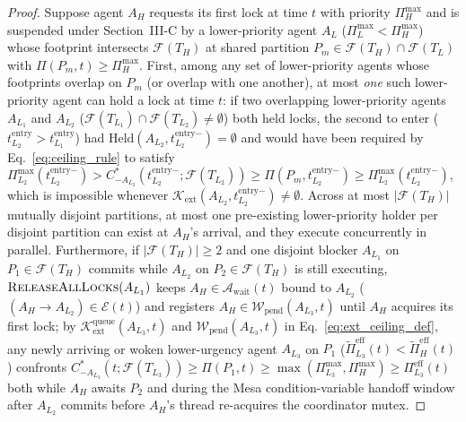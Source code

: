 \documentclass[conference,10pt]{IEEEtran}
\begin{document}
\begin{proof}
Suppose agent $A_H$ requests its first lock at time $t$ with priority $\Pi_H^{\max}$ and is suspended under Section~III-C by a lower-priority agent $A_L$ ($\Pi_L^{\max} < \Pi_H^{\max}$) whose footprint intersects $\mathcal{F}(T_H)$ at shared partition $P_m \in \mathcal{F}(T_H) \cap \mathcal{F}(T_L)$ with $\Pi(P_m, t) \ge \Pi_H^{\max}$. First, among any set of lower-priority agents whose footprints overlap on $P_m$ (or overlap with one another), at most \textit{one} such lower-priority agent can hold a lock at time $t$: if two overlapping lower-priority agents $A_{L_1}$ and $A_{L_2}$ ($\mathcal{F}(T_{L_1}) \cap \mathcal{F}(T_{L_2}) \ne \emptyset$) both held locks, the second to enter ($t_{L_2}^{\text{entry}} > t_{L_1}^{\text{entry}}$) had $\text{Held}(A_{L_2}, t_{L_2}^{\text{entry}-}) = \emptyset$ and would have been required by Eq.~\eqref{eq:ceiling_rule} to satisfy $\Pi_{L_2}^{\max}(t_{L_2}^{\text{entry}-}) > C_{-A_{L_2}}^*(t_{L_2}^{\text{entry}-}; \mathcal{F}(T_{L_2})) \ge \Pi(P_m, t_{L_2}^{\text{entry}-}) \ge \Pi_{L_2}^{\max}(t_{L_2}^{\text{entry}-})$, which is impossible whenever $\mathcal{K}_{\text{ext}}(A_{L_2}, t_{L_2}^{\text{entry}-}) \ne \emptyset$. Across at most $|\mathcal{F}(T_H)|$ mutually disjoint partitions, at most one pre-existing lower-priority holder per disjoint partition can exist at $A_H$'s arrival, and they execute concurrently in parallel. Furthermore, if $|\mathcal{F}(T_H)| \ge 2$ and one disjoint blocker $A_{L_1}$ on $P_1 \in \mathcal{F}(T_H)$ commits while $A_{L_2}$ on $P_2 \in \mathcal{F}(T_H)$ is still executing, $\textsc{ReleaseAllLocks}(A_{L_1})$ keeps $A_H \in \mathcal{A}_{\text{wait}}(t)$ bound to $A_{L_2}$ ($(A_H \to A_{L_2}) \in \mathcal{E}(t)$) and registers $A_H \in \mathcal{W}_{\text{pend}}(A_{L_3}, t)$ until $A_H$ acquires its first lock; by $\mathcal{K}_{\text{ext}}^{\text{queue}}(A_{L_3}, t)$ and $\mathcal{W}_{\text{pend}}(A_{L_3}, t)$ in Eq.~\eqref{eq:ext_ceiling_def}, any newly arriving or woken lower-urgency agent $A_{L_3}$ on $P_1$ ($\tilde{\Pi}_{L_3}^{\text{eff}}(t) < \tilde{\Pi}_H^{\text{eff}}(t)$) confronts $C_{-A_{L_3}}^*(t; \mathcal{F}(T_{L_3})) \ge \Pi(P_1, t) \ge \max(\Pi_{L_3}^{\max}, \Pi_H^{\max}) \ge \Pi_{L_3}^{\text{eff}}(t)$ both while $A_H$ awaits $P_2$ and during the Mesa condition-variable handoff window after $A_{L_2}$ commits before $A_H$'s thread re-acquires the coordinator mutex.


\end{proof}
\end{document}
